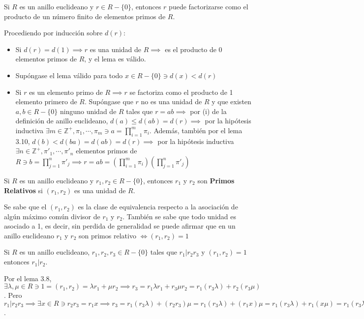 \begin{lema}
    Si $R$ es un anillo euclideano y $r\in R-\{0\}$, entonces $r$ puede factorizarse como el producto de un número finito de elementos primos de $R$. 
    \begin{dem}
        Procediendo por inducción sobre $d(r)$: 
        \begin{itemize}
            \item Si $d(r)=d(1)\implies r$ es una unidad de $R\implies$ es el producto de 0 elementos primos de $R$, y el lema es válido. 
            \item Supóngase el lema válido para todo $x\in R-\{0\}\ni d(x)<d(r)$
            \item Si $r$ es un elemento primo de $R\implies r$ se factoriza como el producto de 1 elemento primero de $R$. Supóngase que $r$ no es una unidad de $R$ y que existen $a,b\in R-\{0\}$ ninguno unidad de $R$ tales que $r=ab\implies$ por (i) de la definición de anillo euclideano, $d(a)\leq d(ab)=d(r)\implies$ por la hipótesis inductiva $\exists m\in\mathbb{Z}^+, \pi_1,\cdots, \pi_m \ni a=\prod_{i=1}^m \pi_i$. Además, también por el lema 3.10, $d(b)<d(ba)=d(ab)=d(r)\implies$ por la hipótesis inductiva $\exists n\in\mathbb{Z}^+,\pi'_1,\cdots,\pi'_n$ elementos primos de $R\ni b=\prod_{j=1}^n\pi'_j\implies r=ab=\left(\prod_{i=1}^m \pi_i\right)\left(\prod_{j=1}^n \pi'_j\right)$
        \end{itemize}
    \end{dem}
\end{lema}

\begin{definicion}
    Si $R$ es un anillo euclideano y $r_1,r_2\in R-\{0\}$, entonces $r_1$ y $r_2$ son \textbf{Primos Relativos} si $(r_1,r_2)$ es una unidad de $R$. 
\end{definicion}

\begin{nota}
    Se sabe que el $(r_1,r_2)$ es la clase de equivalencia respecto a la asociación de algún máximo común divisor de $r_1$ y $r_2$. También se sabe que todo unidad es asociado a 1, es decir, sin perdida de generalidad se puede afirmar que en un anillo euclideano $r_1$ y $r_2$ son primos relativo $\iff (r_1,r_2)=1$
\end{nota}

\begin{lema}[3.12]
    Si $R$ es un anillo euclideano, $r_1,r_2,r_3\in R-\{0\}$ tales que $r_1|r_2r_3$ y $(r_1,r_2)=1$ entonces $r_1|r_2$. 
    \begin{dem}
        Por el lema 3.8, $\exists \lambda, \mu\in R\ni 1=(r_1,r_2)=\lambda r_1+\mu r_2\implies r_3=r_1\lambda r_1+r_3\mu r_2=r_1(r_3\lambda)+r_2(r_3\mu)$. Pero $r_1|r_2r_3\implies \exists x\in R\ni r_2r_3=r_1x\implies r_3=r_1(r_3\lambda)+(r_2r_3)\mu =r_1(r_3\lambda)+(r_1x)\mu =r_1(r_3\lambda)+r_1(x\mu)=r_1(r_3\lambda +x\mu)\implies r_1|r_3$.
    \end{dem}
\end{lema}

